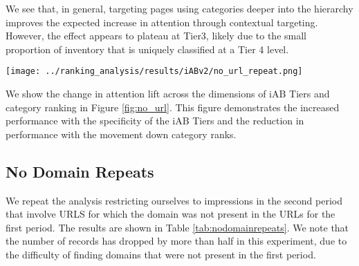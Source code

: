 \documentclass[sigconf]{acmart}
\begin{document}
We see that, in general, targeting pages using categories deeper into the hierarchy
improves the expected increase in attention through contextual targeting.
However, the effect appears to plateau at Tier3, likely due to the small proportion of inventory
that is uniquely classified at a Tier 4 level.

\begin{figure*}
\texttt{[image: ../ranking\_analysis/results/iABv2/no\_url\_repeat.png]}
\caption{Expected Lift in Attention Time on Inventory without Repeated URLs.}
\label{fig:no_url}
\end{figure*}

We show the change in attention lift across the dimensions of iAB Tiers and category ranking
in Figure \ref{fig:no_url}. This figure demonstrates the increased performance with the specificity
of the iAB Tiers and the reduction in performance with the movement down category ranks.

\subsection{No Domain Repeats}
We repeat the analysis restricting ourselves to impressions in the second period
that involve URLS for which the domain was not present in the URLs for the first period.
The results are shown in Table \ref{tab:nodomainrepeats}.
We note that the number of records has dropped by
more than half in this experiment, due to the difficulty of finding domains that were
not present in the first period.
\end{document}
